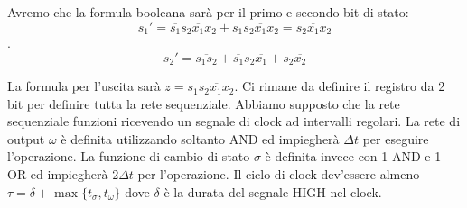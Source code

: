 
Avremo che la formula booleana sarà per il primo e secondo bit di stato:
\[ s_1' = \overbar{s_1}s_2\overbar{x_1}x_2 + s_1s_2\overbar{x_1}x_2 = s_2\overbar{x_1}x_2 \]. 
\[ s_2' = \overbar{s_1s_2}+ \overbar{s_1}s_2\overbar{x_1} + s_2\overbar{x_2}\]

La formula per l'uscita sarà $ z = s_1\overbar{s_2x_1x_2} $. Ci rimane da definire il registro da 2 bit per definire tutta la rete sequenziale. Abbiamo supposto che la rete sequenziale funzioni ricevendo un segnale di clock ad intervalli regolari.
La rete di output $ \omega $ è definita utilizzando soltanto AND ed impiegherà $ \Delta t $ per eseguire l'operazione. La funzione di cambio di stato $ \sigma $ è definita invece con 1 AND e 1 OR ed impiegherà $ 2\Delta t $ per l'operazione.
Il ciclo di clock dev'essere almeno $ \tau = \delta + \max\{t_{\sigma}, t_{\omega}\} $ dove $ \delta $ è la durata del segnale HIGH nel clock.
